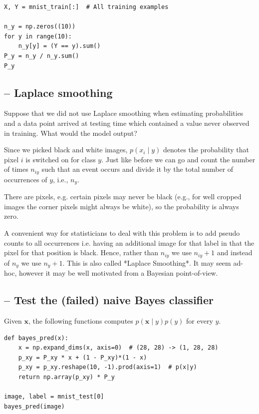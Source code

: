 \begin{lstlisting}
X, Y = mnist_train[:]  # All training examples

n_y = np.zeros((10))
for y in range(10):
    n_y[y] = (Y == y).sum()
P_y = n_y / n_y.sum()
P_y
\end{lstlisting}

\subsection{-- Laplace smoothing}

Suppose that we did not use Laplace smoothing when estimating probabilities and
a data point arrived at testing time which contained a value never observed in
training. What would the model output?

Since we picked black and white images, $p(x_i  \mid  y)$ denotes the
probability that pixel $i$ is switched on for class $y$. Just like before we can
go and count the number of times $n_{iy}$ such that an event occurs and divide
it by the total number of occurrences of $y$, i.e., $n_y$.

There are pixels, e.g. certain pixels may never be black (e.g., for well cropped
images the corner pixels might always be white), so the probability is always
zero.

A convenient way for statisticians to deal with this problem is to add pseudo
counts to all occurrences i.e. having an additional image for that label in that
the pixel for that position is black. Hence, rather than $n_{iy}$ we use
$n_{iy}+1$ and instead of $n_y$ we use $n_{y} + 1$. This is also called *Laplace
Smoothing*. It may seem ad-hoc, however it may be well motivated from a Bayesian
point-of-view.







\subsection{-- Test the (failed) naive Bayes classifier}

Given $\mathbf x$, the following functions computes $p(\mathbf x \mid y)p(y)$ for every $y$.

\begin{lstlisting}
def bayes_pred(x):
    x = np.expand_dims(x, axis=0)  # (28, 28) -> (1, 28, 28)
    p_xy = P_xy * x + (1 - P_xy)*(1 - x)
    p_xy = p_xy.reshape(10, -1).prod(axis=1)  # p(x|y)
    return np.array(p_xy) * P_y

image, label = mnist_test[0]
bayes_pred(image)
\end{lstlisting}


